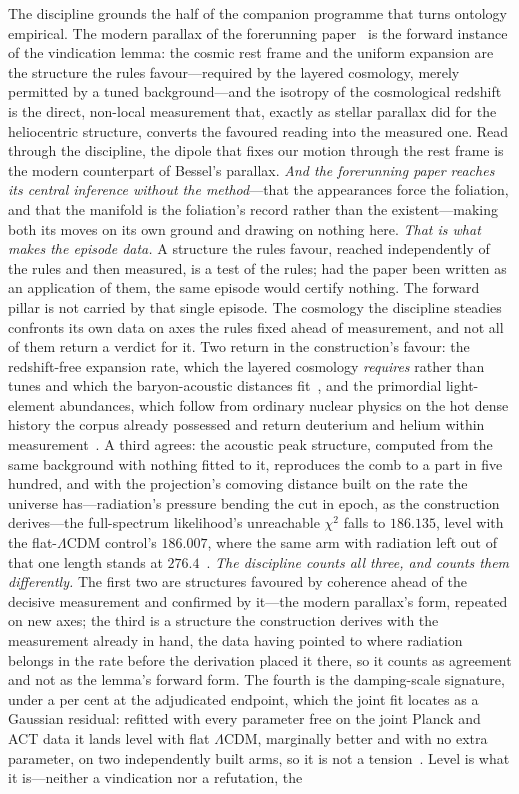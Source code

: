 \documentclass[11pt,a4paper]{article}
\begin{document}
The discipline grounds the half of the companion programme that turns ontology empirical. The modern parallax of the forerunning paper~\cite{JanzenModernParallax} is the forward instance of the vindication lemma: the cosmic rest frame and the uniform expansion are the structure the rules favour---required by the layered cosmology, merely permitted by a tuned background---and the isotropy of the cosmological redshift is the direct, non-local measurement that, exactly as stellar parallax did for the heliocentric structure, converts the favoured reading into the measured one. Read through the discipline, the dipole that fixes our motion through the rest frame is the modern counterpart of Bessel's parallax. \emph{And the forerunning paper reaches its central inference without the method}---that the appearances force the foliation, and that the manifold is the foliation's record rather than the existent---making both its moves on its own ground and drawing on nothing here. \emph{That is what makes the episode data.} A structure the rules favour, reached independently of the rules and then measured, is a test of the rules; had the paper been written as an application of them, the same episode would certify nothing. The forward pillar is not carried by that single episode. The cosmology the discipline steadies confronts its own data on axes the rules fixed ahead of measurement, and not all of them return a verdict for it. Two return in the construction's favour: the redshift-free expansion rate, which the layered cosmology \emph{requires} rather than tunes and which the baryon-acoustic distances fit~\cite{JanzenCRcosmology}, and the primordial light-element abundances, which follow from ordinary nuclear physics on the hot dense history the corpus already possessed and return deuterium and helium within measurement~\cite{JanzenCosmogenesis}. A third agrees: the acoustic peak structure, computed from the same background with nothing fitted to it, reproduces the comb to a part in five hundred, and with the projection's comoving distance built on the rate the universe has---radiation's pressure bending the cut in epoch, as the construction derives---the full-spectrum likelihood's unreachable $\chi^{2}$ falls to $186.135$, level with the flat-$\Lambda$CDM control's $186.007$, where the same arm with radiation left out of that one length stands at $276.4$~\cite{JanzenCRcosmology}. \emph{The discipline counts all three, and counts them differently.} The first two are structures favoured by coherence ahead of the decisive measurement and confirmed by it---the modern parallax's form, repeated on new axes; the third is a structure the construction derives with the measurement already in hand, the data having pointed to where radiation belongs in the rate before the derivation placed it there, so it counts as agreement and not as the lemma's forward form. The fourth is the damping-scale signature, under a per cent at the adjudicated endpoint, which the joint fit locates as a Gaussian residual: refitted with every parameter free on the joint Planck and ACT data it lands level with flat $\Lambda$CDM, marginally better and with no extra parameter, on two independently built arms, so it is not a tension~\cite{JanzenCRcosmology}. Level is what it is---neither a vindication nor a refutation, the 
\end{document}
